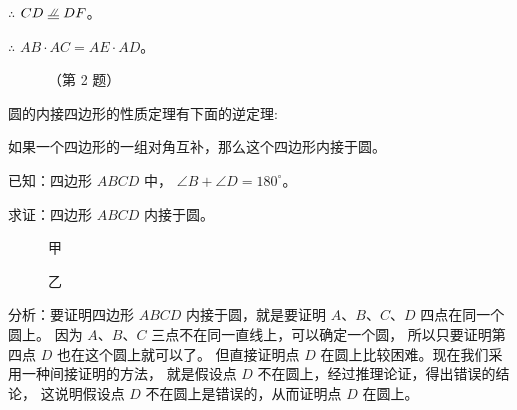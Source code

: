 \begin{enhancedline}
$\therefore$ \quad $CD \pxqdy DF$。


$\therefore$ \quad $AB \cdot AC = AE \cdot AD$。

\begin{figure}[htbp]
    \centering
    \begin{minipage}[b]{7.5cm}
        \centering
        
        \caption{}\label{fig:czjh2-7-28}
    \end{minipage}
    \qquad
    \begin{minipage}[b]{7cm}
        \centering
        
        \caption*{（第 2 题）}
    \end{minipage}
\end{figure}


\begin{lianxi}



\end{lianxi}


圆的内接四边形的性质定理有下面的逆定理:

\begin{dingli}[定理]
    如果一个四边形的一组对角互补，那么这个四边形内接于圆。
\end{dingli}

已知：四边形 $ABCD$ 中， $\angle B + \angle D = 180^\circ$。

求证：四边形 $ABCD$ 内接于圆。

\begin{figure}[htbp]
    \centering
    \begin{minipage}[b]{6cm}
        \centering
        
        \caption*{甲}
    \end{minipage}
    \qquad
    \begin{minipage}[b]{6cm}
        \centering
        
        \caption*{乙}
    \end{minipage}
    \caption{}\label{fig:czjh2-7-29}
\end{figure}

分析：要证明四边形 $ABCD$ 内接于圆，就是要证明 $A$、$B$、$C$、$D$ 四点在同一个圆上。
因为 $A$、$B$、$C$ 三点不在同一直线上，可以确定一个圆，
所以只要证明第四点 $D$ 也在这个圆上就可以了。
但直接证明点 $D$ 在圆上比较困难。现在我们采用一种间接证明的方法，
就是假设点 $D$ 不在圆上，经过推理论证，得出错误的结论，
这说明假设点 $D$ 不在圆上是错误的，从而证明点 $D$ 在圆上。


\end{enhancedline}
